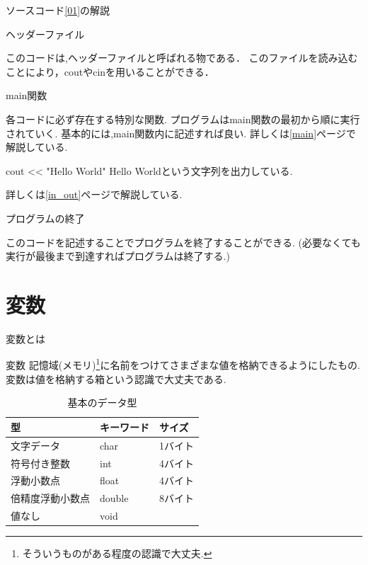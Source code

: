 \begin{frame}{ソースコード\ref{01}の解説}
    \begin{block}{ヘッダーファイル}
        
        このコードは,ヘッダーファイルと呼ばれる物である．
        このファイルを読み込むことにより，coutやcinを用いることができる．
    \end{block}
    \newpage
    \begin{block}{main関数}
        
        各コードに必ず存在する特別な関数.
        プログラムはmain関数の最初から順に実行されていく.
        基本的には,main関数内に記述すれば良い.
        詳しくは\ref{main}ページで解説している.
    \end{block}
    \begin{block}{cout << "Hello World"}
        Hello Worldという文字列を出力している.
    
        詳しくは\ref{in_out}ページで解説している.
    \end{block}

    \begin{block}{プログラムの終了}
    
    このコードを記述することでプログラムを終了することができる.
    (必要なくても実行が最後まで到達すればプログラムは終了する.)
\end{block}
\end{frame}


\section{変数}
\begin{frame}{変数とは}
    \begin{block}{変数}
        記憶域(メモリ)\footnote{そういうものがある程度の認識で大丈夫.}に名前をつけてさまざまな値を格納できるようにしたもの.
        変数は値を格納する箱という認識で大丈夫である.
    \end{block}
    \begin{table}[]
        \centering
        \begin{tabular}{|l|l|l|}
            \hline
            型       & キーワード  & サイズ\\
            \hline
            文字データ & char  & 1バイト\\
            符号付き整数 & int  & 4バイト\\
            浮動小数点 & float & 4バイト\\
            倍精度浮動小数点 & double & 8バイト\\
            値なし & void & \\
            \hline
        \end{tabular}
        \caption{基本のデータ型}
        \label{tab:my_label}
    \end{table}
\end{frame}

